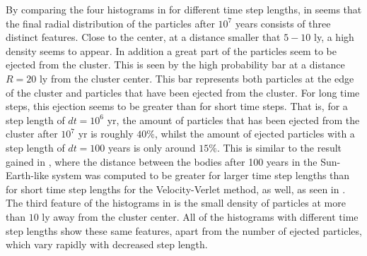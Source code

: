 By comparing the four histograms in  for different time step lengths, in seems that the final radial distribution of the particles after $10^7$ years consists of three distinct features. Close to the center, at a distance smaller that $5-10$ ly, a high density seems to appear. 
In addition a great part of the particles seem to be ejected from the cluster. 
This is seen by the high probability bar at a distance $R=20$ ly from the cluster center. This bar represents both particles at the edge of the cluster and particles that have been ejected from the cluster. 
For long time steps, this ejection seems to be greater than for short time steps.
That is, for a step length of $dt = 10^6$ yr, the amount of particles that has been ejected from the cluster after $10^7$ yr is roughly $40 \%$, whilst the amount of ejected particles with a step length of $dt = 100$ years is only around $15 \%$.
This is similar to the result gained in , where the distance between the bodies after 100 years in the Sun-Earth-like system was computed to be greater for larger time step lengths than for short time step lengths for the Velocity-Verlet method, as well, as seen in . 
The third feature of the histograms in  is the small density of particles at more than $10$ ly away from the cluster center.
All of the histograms with different time step lengths show these same features, apart from the number of ejected particles, which vary rapidly with decreased step length. 
